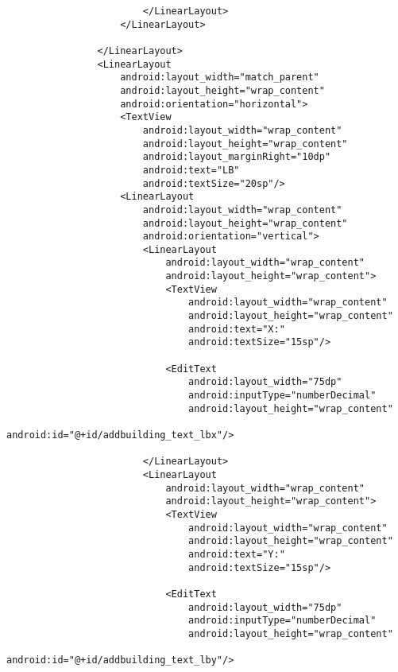 \begin{lstlisting}
                        </LinearLayout>
                    </LinearLayout>

                </LinearLayout>
                <LinearLayout
                    android:layout_width="match_parent"
                    android:layout_height="wrap_content"
                    android:orientation="horizontal">
                    <TextView
                        android:layout_width="wrap_content"
                        android:layout_height="wrap_content"
                        android:layout_marginRight="10dp"
                        android:text="LB"
                        android:textSize="20sp"/>
                    <LinearLayout
                        android:layout_width="wrap_content"
                        android:layout_height="wrap_content"
                        android:orientation="vertical">
                        <LinearLayout
                            android:layout_width="wrap_content"
                            android:layout_height="wrap_content">
                            <TextView
                                android:layout_width="wrap_content"
                                android:layout_height="wrap_content"
                                android:text="X:"
                                android:textSize="15sp"/>

                            <EditText
                                android:layout_width="75dp"
                                android:inputType="numberDecimal"
                                android:layout_height="wrap_content"
                                android:id="@+id/addbuilding_text_lbx"/>

                        </LinearLayout>
                        <LinearLayout
                            android:layout_width="wrap_content"
                            android:layout_height="wrap_content">
                            <TextView
                                android:layout_width="wrap_content"
                                android:layout_height="wrap_content"
                                android:text="Y:"
                                android:textSize="15sp"/>

                            <EditText
                                android:layout_width="75dp"
                                android:inputType="numberDecimal"
                                android:layout_height="wrap_content"
                                android:id="@+id/addbuilding_text_lby"/>



\end{lstlisting}
